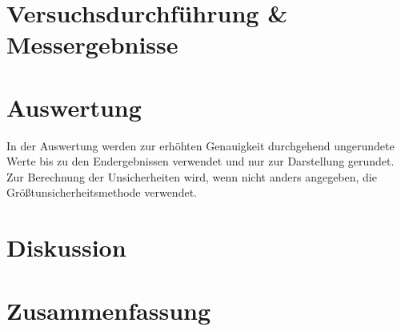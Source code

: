 \documentclass[12pt,a4paper,twoside]{article}
\theoremstyle{definition}
\begin{document}
\section{Versuchsdurchführung \& Messergebnisse}



\section{Auswertung}

In der Auswertung werden zur erhöhten Genauigkeit durchgehend ungerundete Werte bis zu den Endergebnissen verwendet und nur zur Darstellung gerundet. \\
Zur Berechnung der Unsicherheiten wird, wenn nicht anders angegeben, die Größtunsicherheitsmethode verwendet.



\section{Diskussion}



\section{Zusammenfassung}



\printbibliography[heading=bibintoc]
\end{document}
